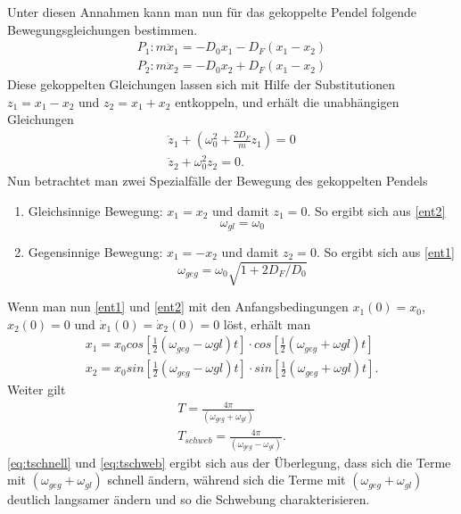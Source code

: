 Unter diesen Annahmen kann man nun für das gekoppelte Pendel folgende Bewegungsgleichungen bestimmen.
\begin{gather}
P_1: m\ddot{x}_1= -D_0x_1-D_F(x_1-x_2)\\
P_2: m\ddot{x}_2= -D_0x_2+D_F(x_1-x_2)
\end{gather}
Diese gekoppelten Gleichungen lassen sich mit Hilfe der Substitutionen $z_1=x_1-x_2$ und $z_2=x_1+x_2$ entkoppeln, und erhält die unabhängigen Gleichungen
\begin{gather}
\label{ent1}\ddot{z}_1+(\omega_0^2+\frac{2D_F}{m}z_1)=0\\
\label{ent2}\ddot{z}_2+\omega_0^2z_2 = 0.
\end{gather}
Nun betrachtet man zwei Spezialfälle der Bewegung des gekoppelten Pendels
\begin{enumerate}
\item Gleichsinnige Bewegung: $x_1=x_2$ und damit $z_1=0$. So ergibt sich aus \ref{ent2}
\begin{equation}
\omega_{gl}=\omega_0
\end{equation}
\item Gegensinnige Bewegung: $x_1=-x_2$ und damit $z_2=0$. So ergibt sich aus \ref{ent1}
\begin{equation}
\omega_{geg}=\omega_0\sqrt{1+2D_F/D_0}
\end{equation}
\end{enumerate}
Wenn man nun \ref{ent1} und \ref{ent2} mit den Anfangsbedingungen $x_1(0)=x_0$, $x_2(0)=0$ und $\dot{x}_1(0)=\dot{x}_2(0)=0$ löst, erhält man
\begin{gather}
x_1=x_0 cos[\frac{1}{2}(\omega_{geg}-\omega{gl})t]\cdot cos[\frac{1}{2}(\omega_{geg}+\omega{gl})t]\\
x_2=x_0 sin[\frac{1}{2}(\omega_{geg}-\omega{gl})t]\cdot sin[\frac{1}{2}(\omega_{geg}+\omega{gl})t].
\end{gather}
Weiter gilt
\begin{gather}
\label{eq:tschnell}T=\frac{4\pi}{(\omega_{geg}+\omega_{gl})}\\
\label{eq:tschweb}T_{schweb}=\frac{4\pi}{(\omega_{geg}-\omega_{gl})}.
\end{gather}
\ref{eq:tschnell} und \ref{eq:tschweb} ergibt sich aus der Überlegung, dass sich die Terme mit $(\omega_{geg}+\omega_{gl})$ schnell ändern, während sich die Terme mit $(\omega_{geg}+\omega_{gl})$ deutlich langsamer ändern und so die Schwebung charakterisieren.
